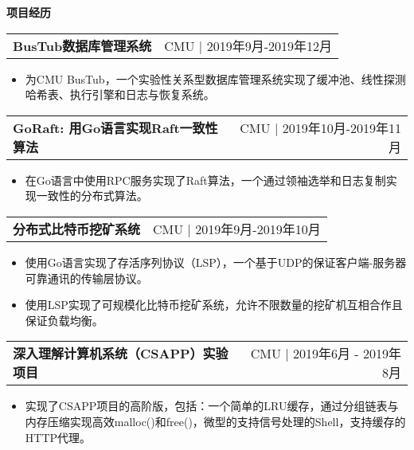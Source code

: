 \documentclass[letterpaper,11pt]{article}
\makeatletter
\newcommand{\resitem}[1]{\item  #1}
\newcommand{\resheading}[1]{{\large \colorbox{mygrey}{\begin{minipage}{\linewidth}{\textbf{#1 \vphantom{p\^{E}}}}\end{minipage}}}}
\newcommand{\ressubsubheading}[2]{
\begin{tabular*}{1.04\linewidth}{l@{\extracolsep{\fill}}r}
	\textbf{#1} & #2 \\
\end{tabular*}\vspace{-6pt}}
\makeatother
\begin{document}
\resheading{项目经历}
	\begin{description}
		\item
			\ressubsubheading{BusTub数据库管理系统}{CMU $|$ 2019年9月-2019年12月}
			{ \footnotesize
			\begin{itemize}
				\resitem{为CMU BusTub，一个实验性关系型数据库管理系统实现了缓冲池、线性探测哈希表、执行引擎和日志与恢复系统。}
			\end{itemize}
			}
		
		\item
			\ressubsubheading{GoRaft: 用Go语言实现Raft一致性算法}{CMU $|$ 2019年10月-2019年11月}
				{ \footnotesize
				\begin{itemize}
					\resitem{在Go语言中使用RPC服务实现了Raft算法，一个通过领袖选举和日志复制实现一致性的分布式算法。}
				\end{itemize}
				}
		\item
			\ressubsubheading{分布式比特币挖矿系统}{CMU $|$ 2019年9月-2019年10月}
			{ \footnotesize
			\begin{itemize}
				\resitem{使用Go语言实现了存活序列协议（LSP），一个基于UDP的保证客户端-服务器可靠通讯的传输层协议。}
				\resitem{使用LSP实现了可规模化比特币挖矿系统，允许不限数量的挖矿机互相合作且保证负载均衡。}

			\end{itemize}
			}
		\item
			\ressubsubheading{深入理解计算机系统（CSAPP）实验项目}{CMU $|$ 2019年6月 - 2019年8月}
			{ \footnotesize
			\begin{itemize}
				\resitem{实现了CSAPP项目的高阶版，包括：一个简单的LRU缓存，通过分组链表与内存压缩实现高效malloc()和free()，微型的支持信号处理的Shell，支持缓存的HTTP代理。}
			\end{itemize}
			}
	\end{description}  %
\end{document}
